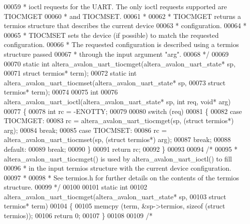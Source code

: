 \begin{DoxyCode}
00059 \textcolor{comment}{ * ioctl requests for the UART. The only ioctl requests supported are TIOCMGET}
00060 \textcolor{comment}{ * and TIOCMSET.}
00061 \textcolor{comment}{ *}
00062 \textcolor{comment}{ * TIOCMGET returns a termios structure that describes the current device}
00063 \textcolor{comment}{ * configuration.}
00064 \textcolor{comment}{ *}
00065 \textcolor{comment}{ * TIOCMSET sets the device (if possible) to match the requested configuration.}
00066 \textcolor{comment}{ * The requested configuration is described using a termios structure passed}
00067 \textcolor{comment}{ * through the input argument "arg".}
00068 \textcolor{comment}{ */}
00069 
00070 \textcolor{keyword}{static} \textcolor{keywordtype}{int} altera\_avalon\_uart\_tiocmget(altera_avalon_uart_state* sp,
00071   \textcolor{keyword}{struct} termios* term);
00072 \textcolor{keyword}{static} \textcolor{keywordtype}{int} altera\_avalon\_uart\_tiocmset(altera_avalon_uart_state* sp,
00073   \textcolor{keyword}{struct} termios* term);
00074 
00075 \textcolor{keywordtype}{int} 
00076 altera_avalon_uart_ioctl(altera_avalon_uart_state* sp, \textcolor{keywordtype}{int} req, \textcolor{keywordtype}{void}* arg)
00077 \{
00078   \textcolor{keywordtype}{int} rc = -ENOTTY;
00079 
00080   \textcolor{keywordflow}{switch} (req)
00081   \{
00082   \textcolor{keywordflow}{case} TIOCMGET:
00083     rc = altera\_avalon\_uart\_tiocmget(sp, (\textcolor{keyword}{struct} termios*) arg);
00084     \textcolor{keywordflow}{break};
00085   \textcolor{keywordflow}{case} TIOCMSET:
00086     rc = altera\_avalon\_uart\_tiocmset(sp, (\textcolor{keyword}{struct} termios*) arg);
00087     \textcolor{keywordflow}{break};
00088   \textcolor{keywordflow}{default}:
00089     \textcolor{keywordflow}{break};
00090   \}
00091   \textcolor{keywordflow}{return} rc;
00092 \}
00093 
00094 \textcolor{comment}{/*}
00095 \textcolor{comment}{ * altera\_avalon\_uart\_tiocmget() is used by altera\_avalon\_uart\_ioctl() to fill}
00096 \textcolor{comment}{ * in the input termios structure with the current device configuration. }
00097 \textcolor{comment}{ *}
00098 \textcolor{comment}{ * See termios.h for further details on the contents of the termios structure.}
00099 \textcolor{comment}{ */}
00100 
00101 \textcolor{keyword}{static} \textcolor{keywordtype}{int} 
00102 altera\_avalon\_uart\_tiocmget(altera_avalon_uart_state* sp,
00103   \textcolor{keyword}{struct} termios* term)
00104 \{
00105   memcpy (term, &sp->termios, sizeof (\textcolor{keyword}{struct} termios));
00106   \textcolor{keywordflow}{return} 0;
00107 \}
00108 
00109 \textcolor{comment}{/*}

\end{DoxyCode}
